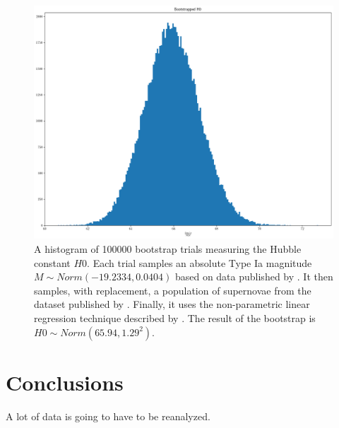\documentclass[linenumbers]{aastex631}
\begin{document}
\begin{figure}
  \includegraphics[width=\linewidth]{bootstrapped_H0.png}
  \caption{A histogram of 100000 bootstrap trials measuring the Hubble constant
  $H0$. Each trial samples an absolute Type Ia magnitude $M \sim Norm(-19.2334,
  0.0404)$ based on data published by \citet{camarena2020}. It then samples,
  with replacement, a population of supernovae from the dataset published by
  \citet{abbott2024}. Finally, it uses the non-parametric linear regression
  technique described by \citet{siegel1982}. The result of the bootstrap is $H0
  \sim Norm(65.94, 1.29^2)$.
  }
\label{fig:H0bootstrap}
\end{figure}

\section{Conclusions}

A lot of data is going to have to be reanalyzed.

{}

\end{document}
